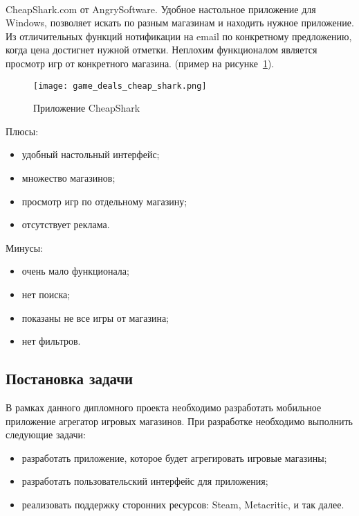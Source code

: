 ~\par
CheapShark.com от AngrySoftware. Удобное настольное приложение для Windows, позволяет искать по разным магазинам и находить нужное приложение. Из отличительных функций нотификации на email по конкретному предложению, когда цена достигнет нужной отметки. Неплохим функционалом является просмотр игр от конкретного магазина. (пример на рисунке~\ref{fig:domain:game_cheap_shark}).

\begin{figure}[H]
  \centering
    \texttt{[image: game\_deals\_cheap\_shark.png]} 
    \caption{Приложение CheapShark}
    \label{fig:domain:game_cheap_shark}
 \end{figure}

Плюсы:
\begin{itemize}
  \item удобный настольный интерфейс;
  \item множество магазинов;
  \item просмотр игр по отдельному магазину;
  \item отсутствует реклама.
\end{itemize}

 Минусы:
 \begin{itemize}
  \item очень мало функционала;
  \item нет поиска;
  \item показаны не все игры от магазина;
  \item нет фильтров.
\end{itemize}
 
\subsection{Постановка задачи}
В рамках данного дипломного проекта необходимо разработать мобильное приложение агрегатор игровых магазинов. При разработке необходимо выполнить следующие задачи:
\begin{itemize}
 \item разработать приложение, которое будет агрегировать игровые магазины;
 \item разработать пользовательский интерфейс для приложения;
 \item реализовать поддержку сторонних ресурсов: Steam, Metacritic, и так далее.
\end{itemize}
 
